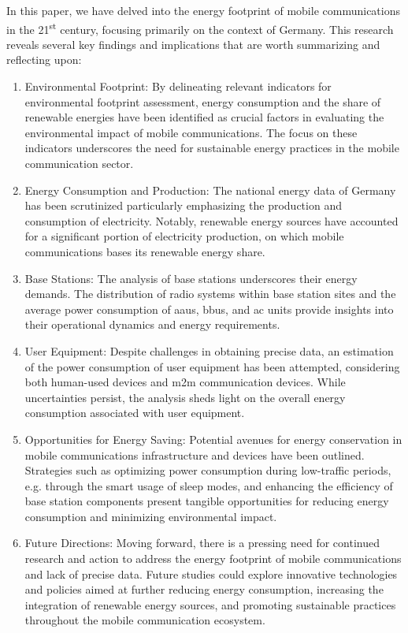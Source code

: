 \documentclass[11pt,a4paper]{article}
\begin{document}
In this paper, we have delved into the energy footprint of mobile communications in the 21\textsuperscript{st} century, focusing primarily on the context of Germany.
This research reveals several key findings and implications that are worth summarizing and reflecting upon:

\begin{enumerate}
  \item Environmental Footprint: By delineating relevant indicators for environmental footprint assessment, energy consumption and the share of renewable energies have been identified as crucial factors in evaluating the environmental impact of mobile communications.
  The focus on these indicators underscores the need for sustainable energy practices in the mobile communication sector.
  \item Energy Consumption and Production: The national energy data of Germany has been scrutinized  particularly emphasizing the production and consumption of electricity.
  Notably, renewable energy sources have accounted for a significant portion of electricity production, on which mobile communications bases its renewable energy share.
  \item Base Stations: The analysis of base stations underscores their energy demands.
  The distribution of radio systems within base station sites and the average power consumption of \acrshort{aau}s, \acrshort{bbu}s, and \acrshort{ac} units provide insights into their operational dynamics and energy requirements.
  \item User Equipment: Despite challenges in obtaining precise data, an estimation of the power consumption of user equipment has been attempted, considering both human-used devices and \acrshort{m2m} communication devices.
  While uncertainties persist, the analysis sheds light on the overall energy consumption associated with user equipment.
  \item Opportunities for Energy Saving: Potential avenues for energy conservation in mobile communications infrastructure and devices have been outlined.
  Strategies such as optimizing power consumption during low-traffic periods, e.g. through the smart usage of sleep modes, and enhancing the efficiency of base station components present tangible opportunities for reducing energy consumption and minimizing environmental impact.
  \item Future Directions: Moving forward, there is a pressing need for continued research and action to address the energy footprint of mobile communications and lack of precise data.
  Future studies could explore innovative technologies and policies aimed at further reducing energy consumption, increasing the integration of renewable energy sources, and promoting sustainable practices throughout the mobile communication ecosystem.
\end{enumerate}
\end{document}
